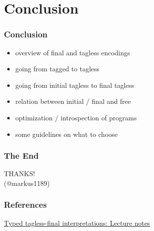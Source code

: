 \documentclass[aspectratio=169, hyperref={colorlinks, linkcolor=beamer@centricgreen}, urlcolor=links]{beamer}
\begin{document}
\section{Conclusion}\label{sec:conclusion}

\begin{frame}
  \frametitle{Conclusion}
  \begin{itemize}
  \item overview of final and tagless encodings
  \item going from tagged to tagless
  \item going from initial tagless to final tagless
  \item relation between initial / final and free
  \item optimization / introspection of programs
  \item some guidelines on what to choose
  \end{itemize}
\end{frame}

\begin{frame}
  \frametitle{The End}
  \begin{center}
    {
      \Huge
      THANKS!\\
    }
    \vfill
    (@markus1189)
  \end{center}
\end{frame}

\begin{frame}
  \frametitle{References}
  \begin{center}
    \href{http://okmij.org/ftp/tagless-final/course/index.html}{Typed tagless-final interpretations: Lecture notes}
  \end{center}
\end{frame}

\appendix{}
\end{document}
